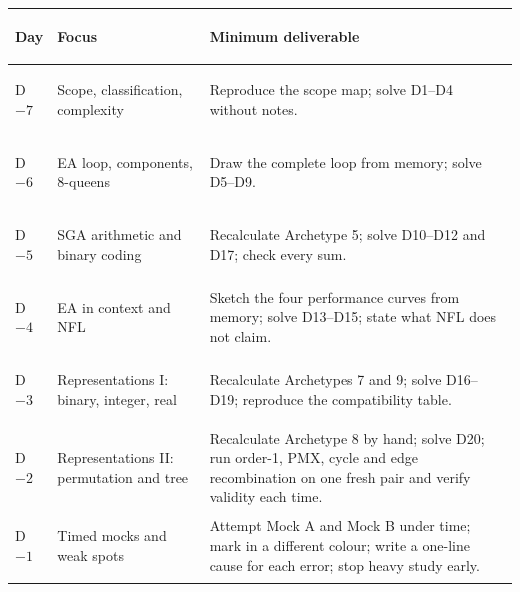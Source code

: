\documentclass[11pt,a4paper]{article}
\begin{document}
\begin{tabular}{@{}>{\bfseries\raggedright\arraybackslash}p{}
  >{\raggedright\arraybackslash}p{}
  >{\raggedright\arraybackslash}p{}@{}}
\toprule
Day & Focus & Minimum deliverable\\
\midrule
D$-7$ & Scope, classification, complexity & Reproduce the scope map; solve D1--D4 without notes.\\
D$-6$ & EA loop, components, 8-queens & Draw the complete loop from memory; solve D5--D9.\\
D$-5$ & SGA arithmetic and binary coding & Recalculate Archetype 5; solve D10--D12 and D17; check every sum.\\
D$-4$ & EA in context and NFL & Sketch the four performance curves from memory; solve D13--D15; state what NFL does not claim.\\
D$-3$ & Representations I: binary, integer, real & Recalculate Archetypes 7 and 9; solve D16--D19; reproduce the compatibility table.\\
D$-2$ & Representations II: permutation and tree & Recalculate Archetype 8 by hand; solve D20; run order-1, PMX, cycle and edge recombination on one fresh pair and verify validity each time.\\
D$-1$ & Timed mocks and weak spots & Attempt Mock A and Mock B under time; mark in a different colour; write a one-line cause for each error; stop heavy study early.\\
\bottomrule
\end{tabular}
\end{document}
